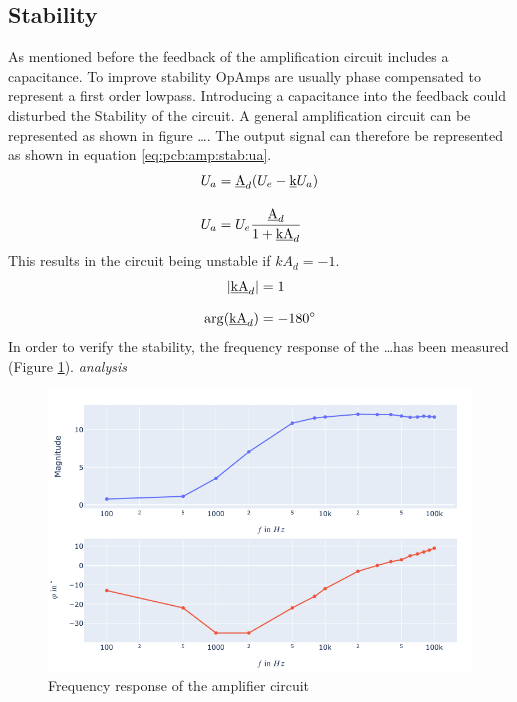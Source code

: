\subsection{Stability}

As mentioned before the feedback of the amplification circuit includes a capacitance. To improve stability OpAmps are usually phase compensated to represent a first order lowpass. Introducing a capacitance into the feedback could disturbed the Stability of the circuit.
%
A general amplification circuit can be represented as shown in figure \dots. The output signal can therefore be represented as shown in equation \ref{eq:pcb:amp:stab:ua}.
%
\begin{align}
  U_a &= \underbar{A}_d (U_e - \underbar{k}U_a)\pmath
  U_a &= U_e \cfrac{\underbar{A}_d}{1 + \underbar{k}\underbar{A}_d}\label{eq:pcb:amp:stab:ua}
\end{align}
%
This results in the circuit being unstable if $kA_d = -1$.
%
\begin{align}
  |\underbar{k}\underbar{A}_d| &= 1\pmath
  \arg(\underbar{k}\underbar{A}_d) &= - 180^\circ
\end{align}
%
In order to verify the stability, the frequency response of the \dots has been measured (Figure \ref{fig:pcb:amp:bode}).\p
\textit{analysis}
%
\begin{figure}
  \centering
  \includegraphics[height=\largeheight]{src/assets/pictures/circuit/amp_bode_small.png}
  \caption{Frequency response of the amplifier circuit}\label{fig:pcb:amp:bode}
\end{figure}
%